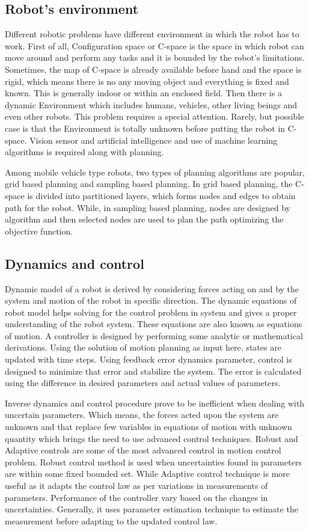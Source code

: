 \documentclass[12pt]{article}
\begin{document}
\subsection{Robot's environment}
Different robotic problems have different environment in which the robot has to work. First of all, Configuration space or C-space is the space in which robot can move around and perform any tasks and it is bounded by the robot's limitations.  Sometimes, the map of C-space is already available before hand and the space is rigid, which means there is no any moving object and everything is fixed and known. This is generally indoor or within an enclosed field. Then there is a dynamic Environment which includes humans, vehicles, other living beings and even other robots. This problem requires a special attention. Rarely, but possible case is that the Environment is totally unknown before putting the robot in C-space. Vision sensor and artificial intelligence and use of machine learning algorithms is required along with planning.
\par \noindent
Among mobile vehicle type robots, two types of planning algorithms are popular, grid based planning and sampling based planning. In grid based planning, the C-space is divided into partitioned layers, which forms nodes and edges to obtain path for the robot. While, in sampling based planning, nodes are designed by algorithm and then selected nodes are used to plan the path optimizing the objective function.
\subsection{Dynamics and control}
Dynamic model of a robot is derived by considering forces acting on and by the system and motion of the robot in specific direction. The dynamic equations of robot model helps solving for the control problem in system and gives a proper understanding of the robot system. These equations are also known as equations of motion. A controller is designed by performing some analytic or mathematical derivations. Using the solution of motion planning as input here, states are updated with time steps. Using feedback error dynamics parameter, control is designed to minimize that error and stabilize the system. The error is calculated using the difference in desired parameters and actual values of parameters.
\par \noindent
Inverse dynamics and control procedure prove to be inefficient when dealing with uncertain parameters. Which means, the forces acted upon the system are unknown and that replace few variables in equations of motion with unknown quantity which brings the need to use advanced control techniques. Robust and Adaptive controls are some of the most advanced control in motion control problem. Robust control method is used when uncertainties found in parameters are within some fixed bounded set. While Adaptive control technique is more useful as it adapts the control law as per variations in measurements of parameters. Performance of the controller vary based on the changes in uncertainties. Generally, it uses parameter estimation technique to estimate the measurement before adapting to the updated control law.
\end{document}
